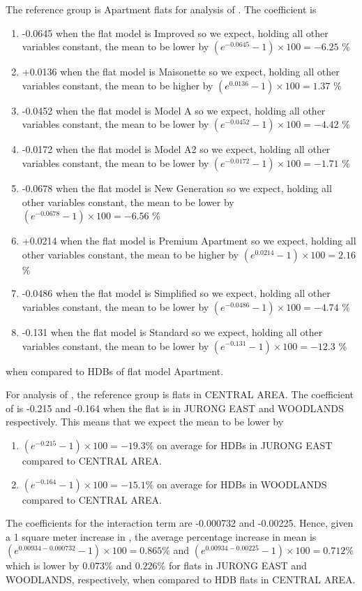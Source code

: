 The reference group is Apartment flats for analysis of . The coefficient is
\begin{enumerate}[noitemsep]
    \item -0.0645 when the flat model is Improved so we expect, holding all other variables constant, the mean  to be lower by $(e^{-0.0645} - 1) \times 100 = -6.25$ \%
    \item +0.0136 when the flat model is Maisonette so we expect, holding all other variables constant, the mean  to be higher by $(e^{0.0136} - 1) \times 100 = 1.37$ \%
    \item -0.0452 when the flat model is Model A so we expect, holding all other variables constant, the mean  to be lower by $(e^{-0.0452} - 1) \times 100 = -4.42$ \%
    \item -0.0172 when the flat model is Model A2 so we expect, holding all other variables constant, the mean  to be lower by $(e^{-0.0172} - 1) \times 100 = -1.71$ \%
    \item -0.0678 when the flat model is New Generation so we expect, holding all other variables constant, the mean  to be lower by $(e^{-0.0678} - 1) \times 100 = -6.56$ \%
    \item +0.0214 when the flat model is Premium Apartment so we expect, holding all other variables constant, the mean  to be higher by $(e^{0.0214} - 1) \times 100 = 2.16$ \%
    \item -0.0486 when the flat model is Simplified so we expect, holding all other variables constant, the mean  to be lower by $(e^{-0.0486} - 1) \times 100 = -4.74$ \%
    \item -0.131 when the flat model is Standard so we expect, holding all other variables constant, the mean  to be lower by $(e^{-0.131} - 1) \times 100 = -12.3$ \%
\end{enumerate}
when compared to HDBs of flat model Apartment.

For analysis of , the reference group is flats in CENTRAL AREA. The coefficient of  is -0.215 and -0.164 when the flat is in JURONG EAST and WOODLANDS respectively. This means that we expect the mean  to be lower by
\begin{enumerate}[noitemsep]
    \item $(e^{-0.215} - 1) \times 100 = -19.3\%$ on average for HDBs in JURONG EAST compared to CENTRAL AREA. 
    \item $(e^{-0.164} - 1) \times 100 = -15.1\%$ on average for HDBs in WOODLANDS compared to CENTRAL AREA.
\end{enumerate}
The coefficients for the interaction term  are -0.000732 and -0.00225. Hence, given a 1 square meter increase in , the average percentage increase in mean  is $(e^{0.00934-0.000732} - 1) \times 100 = 0.865\%$ and $(e^{0.00934-0.00225} - 1) \times 100 = 0.712\%$ which is lower by $0.073\%$ and $0.226\%$ for flats in JURONG EAST and WOODLANDS, respectively, when compared to HDB flats in CENTRAL AREA.

